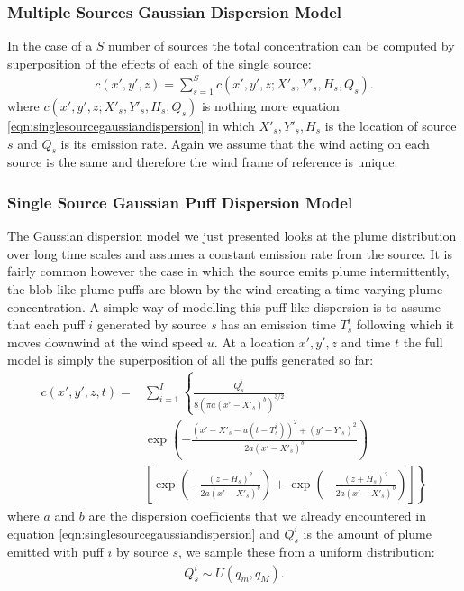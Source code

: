 \documentclass[a4paper,11pt]{report}
\begin{document}
\subsubsection{Multiple Sources Gaussian Dispersion Model}

In the case of a $S$ number of sources the total concentration can be computed by superposition of the effects of each of the single source:
\begin{align}\label{eqn:multiplesourcesgaussiandispersion}
c(x',y',z) = \sum_{s=1}^S c(x',y',z;X'_s,Y'_s,H_s,Q_s).
\end{align}
where $c(x',y',z;X'_s,Y'_s,H_s,Q_s)$ is nothing more equation \ref{eqn:singlesourcegaussiandispersion} in which $X'_s,Y'_s,H_s$ is the location of source $s$ and $Q_s$ is its emission rate.
Again we assume that the wind acting on each source is the same and therefore the wind frame of reference is unique.

\subsubsection{Single Source Gaussian Puff Dispersion Model}

The Gaussian dispersion model we just presented looks at the plume distribution over long time scales and assumes a constant emission rate from the source. It is fairly common however the case in which the source emits plume intermittently, the blob-like plume puffs are blown by the wind creating a time varying plume concentration.
A simple way of modelling this puff like dispersion is to assume that each puff $i$ generated by source $s$ has an emission time $T^i_s$ following which it moves downwind at the wind speed $u$. At a location $x',y',z$ and time $t$ the full model is simply the superposition of all the puffs generated so far:
\begin{align}\label{eqn:singlesourcesgaussianpuffdispersion}
c(x',y',z,t) = & \sum_{i=1}^I \left\{ \frac{Q^i_s}{8(\pi a (x'-X'_s)^b)^{3/2}} \right. \nonumber \\
& \exp\left(-\frac{(x'-X'_s-u(t-T^i_s))^2+(y'-Y'_s)^2}{2 a (x'-X'_s)^b}\right) \nonumber \\
& \left. \left[\exp\left(-\frac{(z-H_s)^2}{2 a (x'-X'_s)^b}\right) + \exp\left(-\frac{(z+H_s)^2}{2 a (x'-X'_s)^b}\right)\right]\right\}
\end{align}
where $a$ and $b$ are the dispersion coefficients that we already encountered in equation \ref{eqn:singlesourcegaussiandispersion} and $Q^i_s$ is the amount of plume emitted with puff $i$ by source $s$, we sample these from a uniform distribution:
\begin{align}\label{eqn:qi}
Q^i_s \sim U(q_m,q_M).
\end{align}
\end{document}

